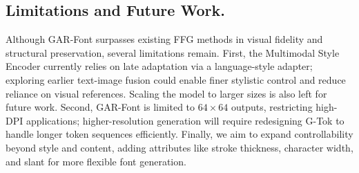 \subsection{Limitations and Future Work.}
Although GAR-Font surpasses existing FFG methods in visual fidelity and structural preservation, several limitations remain. First, the Multimodal Style Encoder currently relies on late adaptation via a language-style adapter; exploring earlier text-image fusion could enable finer stylistic control and reduce reliance on visual references. Scaling the model to larger sizes is also left for future work. Second, GAR-Font is limited to $64 \times 64$ outputs, restricting high-DPI applications; higher-resolution generation will require redesigning G-Tok to handle longer token sequences efficiently. Finally, we aim to expand controllability beyond style and content, adding attributes like stroke thickness, character width, and slant for more flexible font generation.






